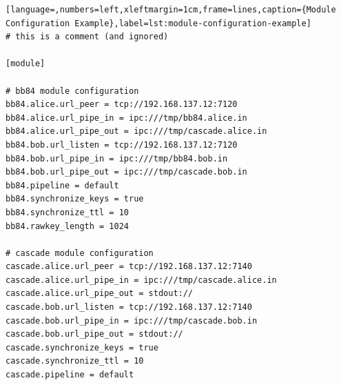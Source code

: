 \begin{lstlisting}[language=,numbers=left,xleftmargin=1cm,frame=lines,caption={Module Configuration Example},label=lst:module-configuration-example]
# this is a comment (and ignored)

[module]

# bb84 module configuration
bb84.alice.url_peer = tcp://192.168.137.12:7120
bb84.alice.url_pipe_in = ipc:///tmp/bb84.alice.in
bb84.alice.url_pipe_out = ipc:///tmp/cascade.alice.in
bb84.bob.url_listen = tcp://192.168.137.12:7120
bb84.bob.url_pipe_in = ipc:///tmp/bb84.bob.in
bb84.bob.url_pipe_out = ipc:///tmp/cascade.bob.in
bb84.pipeline = default
bb84.synchronize_keys = true
bb84.synchronize_ttl = 10
bb84.rawkey_length = 1024

# cascade module configuration
cascade.alice.url_peer = tcp://192.168.137.12:7140
cascade.alice.url_pipe_in = ipc:///tmp/cascade.alice.in
cascade.alice.url_pipe_out = stdout://
cascade.bob.url_listen = tcp://192.168.137.12:7140
cascade.bob.url_pipe_in = ipc:///tmp/cascade.bob.in
cascade.bob.url_pipe_out = stdout://
cascade.synchronize_keys = true
cascade.synchronize_ttl = 10
cascade.pipeline = default
\end{lstlisting}

\medskip

